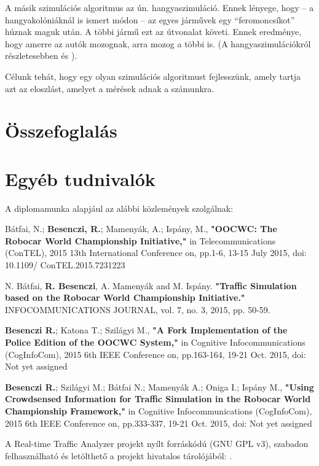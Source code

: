 \documentclass[a4paper,12pt]{report}
\begin{document}
A másik szimulációs algoritmus az ún. hangyaszimuláció. Ennek lényege, hogy -- a hangyakolóniáknál is ismert módon -- az egyes járművek egy ``feromoncsíkot'' húznak maguk után. A többi jármű ezt az útvonalat követi. Ennek eredménye, hogy amerre az autók mozognak, arra mozog a többi is. (A hangyaszimulációkról részletesebben \cite{ant1} és \cite{ant2}).

Célunk tehát, hogy egy olyan szimulációs algoritmust fejlesszünk, amely tartja azt az eloszlást, amelyet a mérések adnak a számunkra.

\chapter{Összefoglalás}





\chapter*{Egyéb tudnivalók}

A diplomamunka alapjául az alábbi közlemények szolgálnak:

Bátfai, N.; {\bf{Besenczi, R.}}; Mamenyák, A.; Ispány, M., {\bf{"OOCWC: The Robocar World Championship Initiative,"}} in Telecommunications (ConTEL), 2015 13th International Conference on, pp.1-6, 13-15 July 2015, doi: 10.1109/ ConTEL.2015.7231223

N. Bátfai, {\bf{R. Besenczi}}, A. Mamenyák and M. Ispány. {\bf{"Traffic Simulation based on the Robocar World Championship Initiative."}} INFOCOMMUNICATIONS JOURNAL, vol. 7, no. 3, 2015, pp. 50-59.

{\bf{Besenczi R.}}; Katona T.; Szilágyi M., {\bf{"A Fork Implementation of the Police Edition of the OOCWC System,"}} in Cognitive Infocommunications (CogInfoCom), 2015 6th IEEE Conference on, pp.163-164, 19-21 Oct. 2015, doi: Not yet assigned

{\bf{Besenczi R.}}; Szilágyi M.; Bátfai N.; Mamenyák A.; Oniga I.; Ispány M., {\bf{"Using Crowdsensed Information for Traffic Simulation in the Robocar World Championship Framework,"}} in Cognitive Infocommunications (CogInfoCom), 2015 6th IEEE Conference on, pp.333-337, 19-21 Oct. 2015, doi: Not yet assigned

A Real-time Traffic Analyzer projekt nyílt forráskódú (GNU GPL v3), szabadon felhasználható és letölthető a projekt hivatalos tárolójából: \cite{rtta}.
\end{document}
